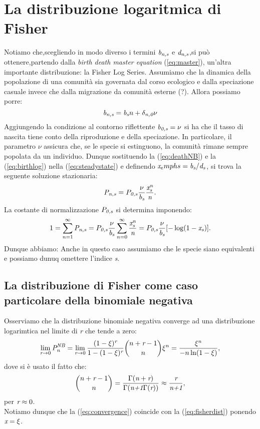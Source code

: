 \section{La distribuzione logaritmica di Fisher}
Notiamo che,scegliendo in modo diverso i termini $\emph{b}_\emph{n,s}$ e $\emph{d}_\emph{n,s}$,si può ottenere,partendo dalla \emph{birth death master equation} (\ref{eq:master}), un'altra importante distribuzione: la Fisher Log Series.
Assumiamo che la dinamica della popolazione di una comunità sia governata dal corso ecologico e dalla speciazione casuale invece che dalla migrazione da comunità esterne (?).
Allora possiamo porre:
\begin{equation}
    \emph{b}_\emph{n,s}=\emph{b}_\emph{s}n+\delta_\emph{n,0}\nu
\label{eq:birthlog}
\end{equation}
Aggiungendo la condizione al contorno riflettente $\emph{b}_\emph{0,s}=\nu$ si ha che il tasso di nascita tiene conto della riproduzione e della speciazione. In particolare, il parametro $\nu$ assicura che, se le specie si estinguono, la comunità rimane sempre popolata da un individuo.
Dunque sostituendo la (\ref{eq:deathNB}) e la (\ref{eq:birthlog}) nella (\ref{eq:steadystate}) e definendo $\emph{x}_emph{s}=\emph{b}_\emph{s}/\emph{d}_\emph{s}$, si trova la seguente soluzione stazionaria:
\begin{equation}
    \emph{P}_\emph{n,s}=P_\emph{0,s}\frac{\nu}{\emph{b}_\emph{s}}\frac{\emph{x}_\emph{s}^{\emph{n}}}{\emph{n}}.
\end{equation}
La costante di normalizzazione $P_\emph{0,s}$ si determina imponendo:
$$
1=\sum_{n=1}^\infty \emph{P}_{\emph{n,s}}=P_\emph{0,s}\frac{\nu}{\emph{b}_\emph{s}}\sum_{n=0}^\infty\frac{\emph{x}_\emph{s}^{\emph{n}}}{\emph{n}}=P_\emph{0,s}\frac{\nu}{\emph{b}_\emph{s}}[-\log(1-\emph{x}_\emph{s})].
$$
Dunque abbiamo:
Anche in questo caso assumiamo che le specie siano equivalenti e possiamo dunuq omettere l'indice \emph{s}.

\subsection{La distribuzione di Fisher come caso particolare della binomiale negativa}
Osserviamo che la distribuzione binomiale negativa converge ad una distribuzione logarimtica nel limite di \emph{r} che tende a zero:
\begin{equation}
    \lim_{\emph{r} \to 0}\emph{P}_\emph{n}^{\emph{NB}}= \lim_{\emph{r}\to0}\frac{(1-\xi)^{\emph{r}}}{1-(1-\xi)^{\emph{r}}}\binom{n+\emph{r}-1}{n}\xi^n=\frac{\xi^n}{-n\ln(1-\xi)},
\label{eq:convergence}
\end{equation}
dove si è usato il fatto che:
$$
\binom{n+\emph{r}-1}{n}=\frac{\Gamma(\emph{n}+\emph{r})}{\Gamma(\emph{n+1}\Gamma(\emph{r}))} \approx\frac{\emph{r}}{\emph{n+1}},
$$
per $\emph{r}\approx 0$.\\
Notiamo dunque che la (\ref{eq:convergence}) coincide con la (\ref{eq:fisherdist}) ponendo  $\emph{x}=\xi$.


